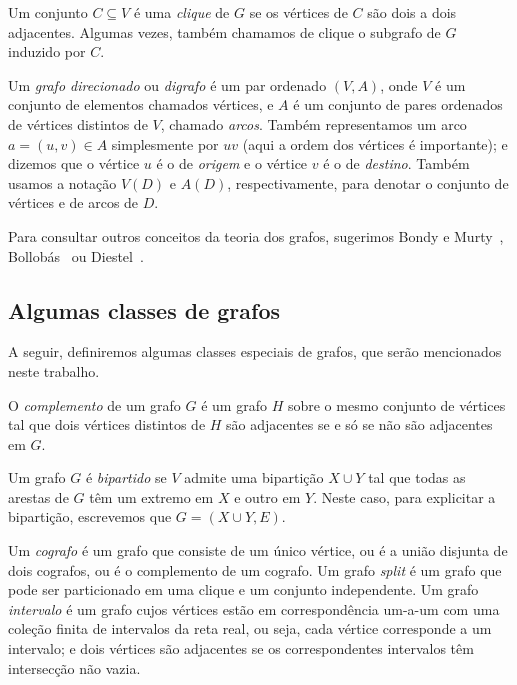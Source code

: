 
Um conjunto $C \subseteq V$ é uma \emph{clique} de $G$ se os vértices de $C$ são dois a dois adjacentes. Algumas vezes, também chamamos de clique o subgrafo de $G$ induzido por $C$.

Um \emph{grafo direcionado} ou \emph{digrafo} é um par ordenado $(V,A)$, onde $V$ é um conjunto de elementos chamados vértices, e $A$ é um conjunto de pares ordenados de vértices distintos de $V$, chamado \emph{arcos}. Também representamos um arco $a = (u,v) \in A$ simplesmente por $uv$ (aqui a ordem dos vértices é importante); e dizemos que o vértice $u$ é o de \emph{origem} e o vértice $v$ é o de \emph{destino}. Também usamos a notação $V(D)$ e $A(D)$, respectivamente, para
denotar o conjunto de vértices e de arcos de $D$.

Para consultar outros conceitos da teoria dos grafos, sugerimos Bondy e Murty~\cite{BondyM2008}, Bollobás~\cite{Bollobas1998} ou Diestel~\cite{Diestel2017}.

\subsection{Algumas classes de grafos}
A seguir, definiremos algumas classes especiais de grafos, que serão mencionados neste trabalho. 

O \emph{complemento} de um grafo $G$ é um grafo $H$ sobre o mesmo conjunto de vértices tal que dois vértices distintos de $H$ são adjacentes se e só se não são adjacentes em $G$.

Um grafo $G$ é \emph{bipartido} se $V$ admite uma bipartição $X\cup Y$ tal que todas as arestas de $G$ têm um extremo em $X$ e outro em $Y$. Neste caso, para explicitar a bipartição, escrevemos que $G=(X\cup Y, E)$. 

Um \emph{cografo} é um grafo que consiste de um único vértice, ou é a união disjunta de dois cografos, ou é o complemento de um cografo.
Um grafo \emph{split} é um grafo que pode ser particionado em uma clique e um
conjunto independente.
%
Um grafo \emph{intervalo} é um grafo cujos vértices estão em correspondência um-a-um com uma coleção finita de intervalos da reta real, ou seja, cada vértice corresponde a um intervalo; e dois vértices são adjacentes se os correspondentes intervalos têm intersecção não vazia.

